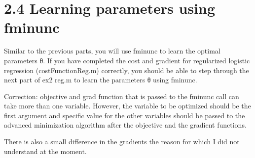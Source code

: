 \documentclass[
]{book}
\begin{document}
\hypertarget{learning-parameters-using-fminunc-1}{%
\section{2.4 Learning parameters using fminunc}\label{learning-parameters-using-fminunc-1}}

Similar to the previous parts, you will use fminunc to learn the optimal parameters θ. If you have completed the cost and gradient for regularized logistic regression (costFunctionReg.m) correctly, you should be able to step through the next part of ex2 reg.m to learn the parameters θ using fminunc.

{
Correction: objective and grad function that is passed to the fminunc call can take more than one variable. However, the variable to be optimized should be the first argument and specific value for the other variables should be passed to the advanced minimization algorithm after the objective and the gradient functions.
}

{
There is also a small difference in the gradients the reason for which I did not understand at the moment.
}
\end{document}
